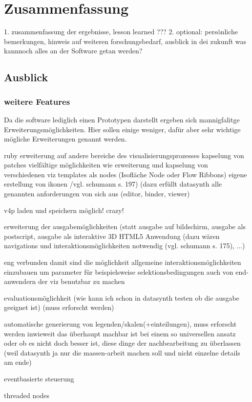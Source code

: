 \documentclass[a4paper, 12pt, onepage, pdftex, headsepline, footsepline]{scrreprt}
\begin{document}
\chapter{Zusammenfassung}
1. zusammenfassung der ergebnisse, lesson learned
???
2. optional: persönliche bemerkungen, hinweis auf weiteren forschungsbedarf, ausblick in dei zukunft
was kannnoch alles an der Software getan werden?
\section{Ausblick}
\subsection{weitere Features}
Da die software lediglich einen Prototypen darstellt ergeben sich mannigfalitge Erweiterungsmöglichkeiten. Hier sollen einige weniger, dafür aber sehr wichtige mögliche Erweiterungen genannt werden.

ruby
erweiterung auf andere bereiche des visualisierungsprozesses
kapselung von patches
  vielfältige möglichkeiten wie
    erweiterung und kapselung von verschiedenen viz templates als nodes (Isofläche Node oder Flow Ribbons)
    eigene erstellung von ikonen /vgl. schumann s. 197)
    (dazu erfüllt datasynth alle genannten anforderungen von sich aus (editor, binder, viewer)

v4p laden und speichern möglich! crazy!

erweiterung der ausgabemöglichkeiten (statt ausgabe auf bildschirm, ausgabe als postscript, ausgabe als interaktive 3D HTML5 Anwendung (dazu wären navigations und interaktionsmöglichkeiten notwendig (vgl. schumann s. 175), ...)

eng verbunden damit sind die möglichkeit allgemeine interaktionsmöglichkeiten einzubauen um parameter für beispielsweise selektionsbedingungen auch von end-anwendern der viz benutzbar zu machen

evaluationsmöglichkeit (wie kann ich schon in datasynth testen ob die ausgabe geeignet ist) (muss erforscht werden)

automatische generierung von legenden/skalen(+einteilungen), muss erforscht werden inwieweit das überhaupt machbar ist bei einem so universellen ansatz oder ob es nicht doch besser ist, diese dinge der nachbearbeitung zu überlassen (weil datasynth ja nur die massen-arbeit machen soll und nicht einzelne details am ende)

eventbasierte steuerung

threaded nodes
\end{document}

